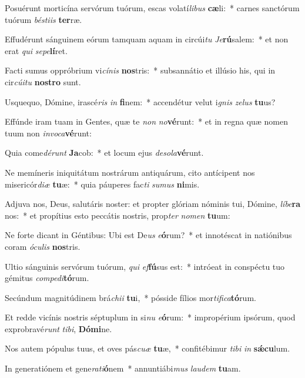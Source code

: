 \item Posuérunt morticína servórum tuórum, escas volatí\textit{li}\textit{bus} \textbf{cæ}li:~* carnes sanctórum tuórum \textit{bés}\textit{ti}\textit{is} \textbf{ter}ræ.
\item Effudérunt sánguinem eórum tamquam aquam in circúi\textit{tu} \textit{Je}\textbf{rú}salem:~* et non erat \textit{qui} \textit{se}\textit{pe}\textbf{lí}ret.
\item Facti sumus oppróbrium vi\textit{cí}\textit{nis} \textbf{nos}tris:~* subsannátio et illúsio his, qui in cir\textit{cú}\textit{i}\textit{tu} \textbf{nos}\textbf{tro} sunt.
\item Usquequo, Dómine, irascé\textit{ris} \textit{in} \textbf{fi}nem:~* accendétur velut i\textit{gnis} \textit{ze}\textit{lus} \textbf{tu}us?
\item Effúnde iram tuam in Gentes, quæ te \textit{non} \textit{no}\textbf{vé}runt:~* et in regna quæ nomen tuum non \textit{in}\textit{vo}\textit{ca}\textbf{vé}runt:
\item Quia come\textit{dé}\textit{runt} \textbf{Ja}cob:~* et locum ejus \textit{de}\textit{so}\textit{la}\textbf{vé}runt.
\item Ne memíneris iniquitátum nostrárum antiquárum, cito antícipent nos misericór\textit{di}\textit{æ} \textbf{tu}æ:~* quia páuperes fac\textit{ti} \textit{su}\textit{mus} \textbf{ni}mis.
\item Adjuva nos, Deus, salutáris noster: et propter glóriam nóminis tui, Dómine, \textit{lí}\textit{be}\textbf{ra} nos:~* et propítius esto peccátis nostris, prop\textit{ter} \textit{no}\textit{men} \textbf{tu}um:
\item Ne forte dicant in Géntibus: Ubi est De\textit{us} \textit{e}\textbf{ó}rum?~* et innotéscat in natiónibus coram \textit{ó}\textit{cu}\textit{lis} \textbf{nos}tris.
\item Ultio sánguinis servórum tuórum, \textit{qui} \textit{ef}\textbf{fú}sus est:~* intróeat in conspéctu tuo gémitus \textit{com}\textit{pe}\textit{di}\textbf{tó}rum.
\item Secúndum magnitúdinem brá\textit{chi}\textit{i} \textbf{tu}i,~* pósside fílios mor\textit{ti}\textit{fi}\textit{ca}\textbf{tó}rum.
\item Et redde vicínis nostris séptuplum in si\textit{nu} \textit{e}\textbf{ó}rum:~* impropérium ipsórum, quod exprobravé\textit{runt} \textit{ti}\textit{bi}, \textbf{Dó}\textbf{mi}ne.
\item Nos autem pópulus tuus, et oves pás\textit{cu}\textit{æ} \textbf{tu}æ,~* confitébimur \textit{ti}\textit{bi} \textit{in} \textbf{sǽ}\textbf{cu}lum.
\item In generatiónem et gene\textit{ra}\textit{ti}\textbf{ó}nem~* annuntiábi\textit{mus} \textit{lau}\textit{dem} \textbf{tu}am.

